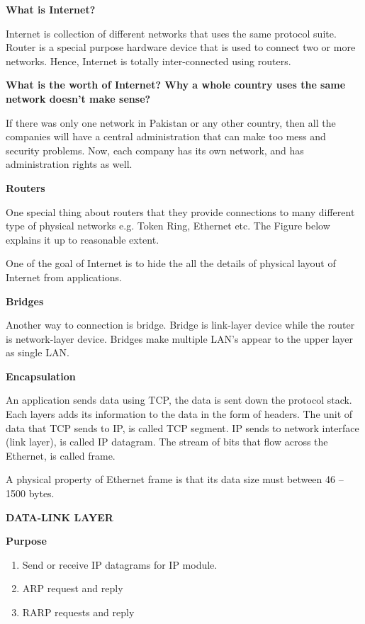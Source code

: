 \documentclass[letterpaper,10pt,english]{sphinxmanual}
\begin{document}
\textbf{What is Internet?}

Internet is collection of different networks that uses the same protocol suite. Router is a special purpose hardware device that is used to connect two or more networks. Hence, Internet is totally inter-connected using routers.

\textbf{What is the worth of Internet? Why a whole country uses the same network doesn't make sense?}

If there was only one network in Pakistan or any other country, then all the companies will have a central administration that can make too mess and security problems. Now, each company has   its own network, and has administration rights as well.

\textbf{Routers}

One special thing about routers that they provide connections to many different type of physical networks e.g. Token Ring, Ethernet etc. The Figure below explains it up to reasonable extent.

One of the goal of Internet is to hide the all the details of physical layout of Internet from applications.

\textbf{Bridges}

Another way to connection is bridge. Bridge is link-layer device while the router is network-layer device. Bridges make multiple LAN's appear to the upper layer as single LAN.

\textbf{Encapsulation}

An application sends data using TCP, the data is sent down the protocol stack. Each layers adds its information to the data in the form of headers. The unit of data that TCP sends to IP, is called TCP segment. IP sends to network interface (link layer), is called IP datagram. The stream of bits that flow across the Ethernet, is called frame.

A physical property of Ethernet frame is that its data size must between 46 – 1500 bytes.

\textbf{DATA-LINK LAYER}

\textbf{Purpose}
\begin{enumerate}
\item {} 
Send or receive IP datagrams for IP module.

\item {} 
ARP request and reply

\item {} 
RARP requests and reply

\end{enumerate}
\end{document}
